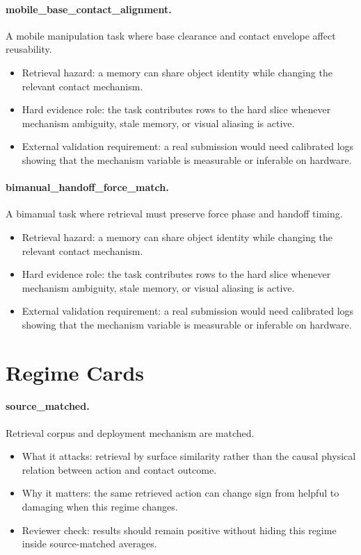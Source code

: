\documentclass{article}
\begin{document}
\paragraph{mobile\_base\_contact\_alignment.} A mobile manipulation task where base clearance and contact envelope affect reusability.
\begin{itemize}
\item Retrieval hazard: a memory can share object identity while changing the relevant contact mechanism.
\item Hard evidence role: the task contributes rows to the hard slice whenever mechanism ambiguity, stale memory, or visual aliasing is active.
\item External validation requirement: a real submission would need calibrated logs showing that the mechanism variable is measurable or inferable on hardware.
\end{itemize}
\paragraph{bimanual\_handoff\_force\_match.} A bimanual task where retrieval must preserve force phase and handoff timing.
\begin{itemize}
\item Retrieval hazard: a memory can share object identity while changing the relevant contact mechanism.
\item Hard evidence role: the task contributes rows to the hard slice whenever mechanism ambiguity, stale memory, or visual aliasing is active.
\item External validation requirement: a real submission would need calibrated logs showing that the mechanism variable is measurable or inferable on hardware.
\end{itemize}
\clearpage
\section{Regime Cards}
\paragraph{source\_matched.} Retrieval corpus and deployment mechanism are matched.
\begin{itemize}
\item What it attacks: retrieval by surface similarity rather than the causal physical relation between action and contact outcome.
\item Why it matters: the same retrieved action can change sign from helpful to damaging when this regime changes.
\item Reviewer check: results should remain positive without hiding this regime inside source-matched averages.
\end{itemize}
\end{document}
